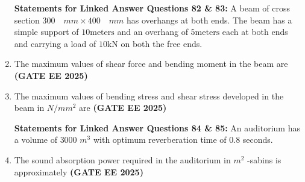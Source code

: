 \documentclass[journal,12pt,onecolumn]{IEEEtran}
\theoremstyle{remark}
\begin{document}
\begin{enumerate}
\textbf{Statements for Linked Answer Questions 82 \& 83:}
\newline
A beam of cross section $300 \quad mm \times 400 \quad mm$ has overhangs at both ends. The beam has a simple support of $10 \text{meters}$ and an overhang of $5 \text{meters}$ each at both ends and carrying a load of $10 \text{kN}$ on both the free ends.
\newline
\item The maximum values of shear force and bending moment in the beam are \hfill\textbf{(GATE EE 2025)}
\begin{enumerate}
\end{enumerate}
\item The maximum values of bending stress and shear stress developed in the beam in $N/mm^2$ are \hfill\textbf{(GATE EE 2025)}
\begin{enumerate}
\end{enumerate}
\textbf{Statements for Linked Answer Questions 84 \& 85:}
An auditorium has a volume of $3000$ $m^3$ with optimum reverberation time of $0.8$ seconds.
\newline
\item The sound absorption power required in the auditorium in $m^2$ -sabins is approximately \hfill\textbf{(GATE EE 2025)}
\begin{enumerate}
\end{enumerate}

\end{enumerate}
\end{document}
